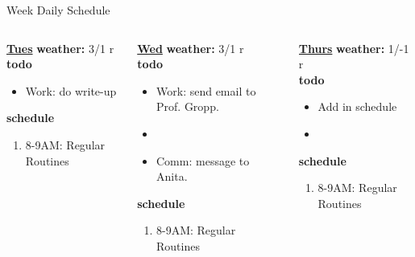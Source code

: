 \begin{columns}
\begin{column}{0.6\linewidth}
\begin{block}{Week Daily Schedule}
\begin{columns}
          \begin{column}{0.14\textwidth}{\small \underline{\bf Tues}}
            {\bf {\tiny  weather:} } {\tiny 3/1 r} \\ 
            {\bf {\tiny todo}}\\ 
            \begin{itemize}
              \tiny \item \tiny Work: do write-up 
            \end{itemize} 
                {{\bf {\tiny  schedule}}}
                \begin{enumerate} 
                  \tiny \item \tiny 8-9AM: Regular Routines 
                \end{enumerate} 
          \end{column}
          \begin{column}{0.14\textwidth}{\small \underline{\bf Wed}}
            {\tiny \bf weather: } {\tiny 3/1 r} \\ 
            {\tiny {\bf todo}}\\
            \begin{itemize}
              \tiny \item \tiny Work: send email to Prof. Gropp. 
            \item \tiny 
            \item \tiny Comm: message to Anita. 
            \end{itemize} 
                {\tiny \bf schedule}\\
                \begin{enumerate} 
                  \tiny \item \tiny 8-9AM: Regular Routines 
                \end{enumerate} 
          \end{column}

          \begin{column}{0.14\textwidth}{\small \underline{\bf Thurs}}
            {\tiny \bf weather: } {\tiny 1/-1 r }\\ 
            {\tiny \bf todo} \\ 
            \begin{itemize}
              \tiny \item \tiny Add in schedule
            \item \tiny 
            \end{itemize} 
                {\tiny {\bf schedule}} \\
                \begin{enumerate} 
                  \tiny \item \tiny 8-9AM: Regular Routines 
                \end{enumerate}
          \end{column} 
          

\end{columns}
\end{block}
\end{column}
\end{columns}
